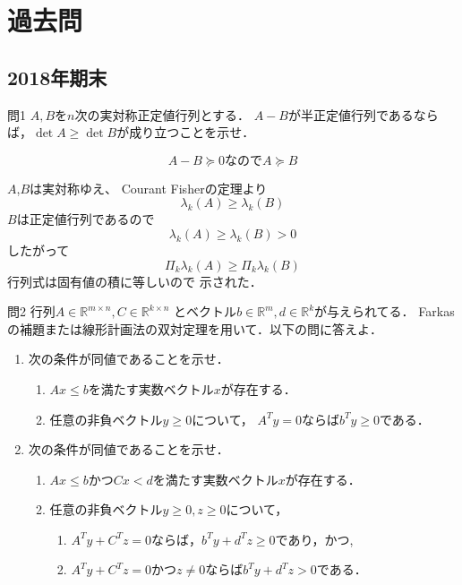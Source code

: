 \section{過去問}
\subsection{2018年期末}
\begin{itembox}[l]{問1}
$A,B$を$n$次の実対称正定値行列とする．
$A-B$が半正定値行列であるならば，$
\det A \geq \det B$が成り立つことを示せ．
\end{itembox}
\begin{equation}
    A - B \succeq 0 \text{なので} A \succeq B
\end{equation}

$A$,$B$は実対称ゆえ、
Courant Fisherの定理より
\begin{equation}
    \lambda_k(A) \geq \lambda_k(B)
\end{equation}
$B$は正定値行列であるので
\begin{equation}
    \lambda_k(A) \geq \lambda_k(B) > 0
\end{equation}
したがって
\begin{equation}
    \Pi_k \lambda_k(A) \geq  \Pi_k \lambda_k(B)
\end{equation}
行列式は固有値の積に等しいので
示された．
\begin{itembox}[l]{問2}
行列$A\in \mathbb{R}^{m \times n}, C \in \mathbb{R}^{k\times n}$
とベクトル$b \in \mathbb{R}^m, d \in \mathbb{R}^k$が与えられてる．
Farkasの補題または線形計画法の双対定理を用いて．以下の問に答えよ．
\begin{enumerate}
    \item 次の条件が同値であることを示せ．
    \begin{enumerate}
        \item $Ax \leq b$を満たす実数ベクトル$x$が存在する．
        \item 任意の非負ベクトル$y\geq 0$について，
        $A^T y =0$ならば$b^T y\geq 0$である．
    \end{enumerate}
    \item 次の条件が同値であることを示せ．
    \begin{enumerate}
        \item $Ax \leq b$かつ$Cx<d$を満たす実数ベクトル$x$が存在する．
        \item 任意の非負ベクトル$y\geq 0,z\geq 0$について，
        \begin{enumerate}
            \item $A^T y + C^Tz = 0$ならば，$b^T y + d^T z \geq 0$であり，かつ,
            \item $A^T y + C^T z = 0$かつ$z\neq 0$ならば$b^T y + d^T z >0$である．
        \end{enumerate}
    \end{enumerate}
\end{enumerate}
\end{itembox}
